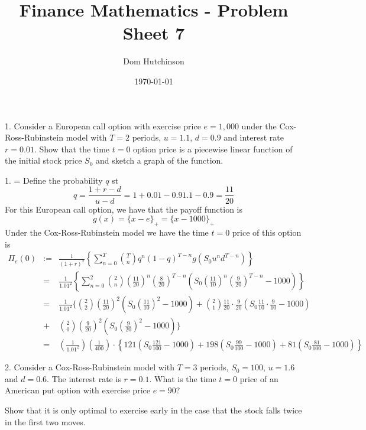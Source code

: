 \documentclass[11pt,a4paper]{article}
\begin{document}
\questionsfalse

\title{Finance Mathematics - Problem Sheet 7}
\author{Dom Hutchinson}
\date{\today}
\maketitle

\begin{question}{1.}
  Consider a European call option with exercise price $e=1,000$ under the Cox-Ross-Rubinstein model with $T=2$ periods, $u=1.1$, $d=0.9$ and interest rate $r=0.01$. Show that the time $t=0$ option price is a piecewise linear function of the initial stock price $S_0$ and sketch a graph of the function.
\end{question}

\begin{answer}{1.}
  \everymath={\displaystyle}
  Define the probability $q$ st
  \[ q=\frac{1+r-d}{u-d}={1+0.01-0.9}{1.1-0.9}=\frac{11}{20} \]
  For this European call option, we have that the payoff function is
  \[ g(x)=\{x-e\}_+=\{x-1000\}_+ \]
  Under the Cox-Ross-Rubinstein model we have the time $t=0$ price of this option is
  \[\begin{array}{rrl}
    \Pi_e(0)&:=&\frac{1}{(1+r)^2}\left\{\sum_{n=0}^T{T\choose n}q^n(1-q)^{T-n}g(S_0u^nd^{T-n})\right\}\\
    &=&\frac1{1.01^2}\left\{\sum_{n=0}^2{2\choose n}\left(\frac{11}{20}\right)^n\left(\frac{8}{20}\right)^{T-n}\left(S_0\left(\frac{11}{10}\right)^n\left(\frac{9}{20}\right)^{T-n}-1000\right)\right\}\\
    &=&\frac1{1.01^2}\Bigg\{{2\choose2}\left(\frac{11}{20}\right)^2\left(S_0\left(\frac{11}{10}\right)^2-1000\right)+{2\choose1}\frac{11}{20}\cdot\frac{9}{20}\left(S_0\frac{11}{10}\cdot\frac9{10}-1000\right)\\
    &+&{2\choose0}\left(\frac{9}{20}\right)^2\left(S_0\left(\frac{9}{20}\right)^2-1000\right)\Bigg\}\\
    &=&\left(\frac{1}{1.01^2}\right)\left(\frac1{400}\right)\cdot\left\{121\left(S_0\frac{121}{100}-1000\right)+198\left(S_0\frac{99}{100}-1000\right)+81\left(S_0\frac{81}{100}-1000\right)\right\}
  \end{array}\]
\end{answer}

\begin{question}{2.}
  Consider a Cox-Ross-Rubinstein model with $T=3$ periods, $S_0=100$, $u=1.6$ and $d=0.6$. The interest rate is $r=0.1$. What is the time $t=0$ price of an American put option with exercise price $e=90$?
  \par Show that it is only optimal to exercise early in the case that the stock falls twice in the first two moves.
\end{question}
\end{document}
